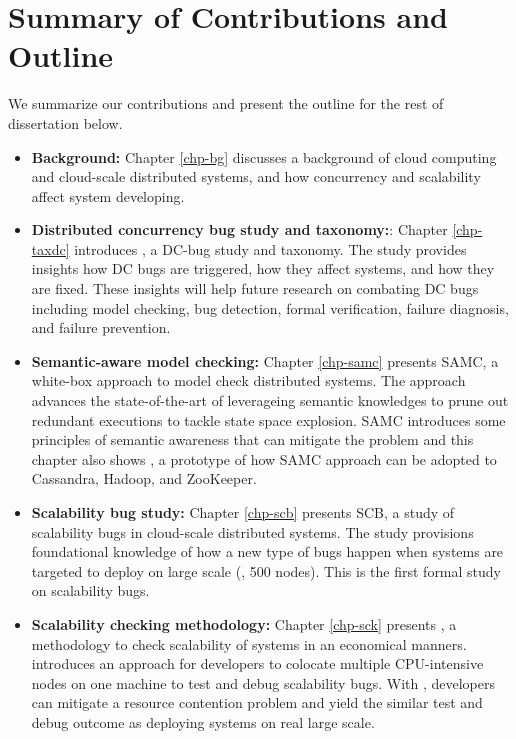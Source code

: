\section{Summary of Contributions and Outline}

We summarize our contributions and present the outline for the rest of
dissertation below.

\begin{itemize}

\item \textbf{Background:} Chapter \ref{chp-bg} discusses a background of cloud
computing and cloud-scale distributed systems, and how concurrency and
scalability affect system developing.

\item \textbf{Distributed concurrency bug study and taxonomy:}: Chapter
\ref{chp-taxdc} introduces \taxdc, a DC-bug study and taxonomy. The study
provides insights how DC bugs are triggered, how they affect systems, and how
they are fixed. These insights will help future research on combating DC bugs
including model checking, bug detection, formal verification, failure diagnosis,
and failure prevention.

\item \textbf{Semantic-aware model checking:} Chapter \ref{chp-samc} presents
SAMC, a white-box approach to model check distributed systems. The approach
advances the state-of-the-art of leverageing semantic knowledges to prune out
redundant executions to tackle state space explosion. SAMC introduces some
principles of semantic awareness that can mitigate the problem and this chapter
also shows \sampro, a prototype of how SAMC approach can be adopted to
Cassandra, Hadoop, and ZooKeeper.

\item \textbf{Scalability bug study:} Chapter \ref{chp-scb} presents SCB, a
study of scalability bugs in cloud-scale distributed systems. The study
provisions foundational knowledge of how a new type of bugs happen when systems
are targeted to deploy on large scale (\eg, 500 nodes). This is the first formal
study on scalability bugs.

\item \textbf{Scalability checking methodology:} Chapter \ref{chp-sck} presents
\sck, a methodology to check scalability of systems in an economical manners.
\sck introduces an approach for developers to colocate multiple CPU-intensive
nodes on one machine to test and debug scalability bugs. With \sck, developers
can mitigate a resource contention problem and yield the similar test and debug
outcome as deploying systems on real large scale.


\end{itemize}
